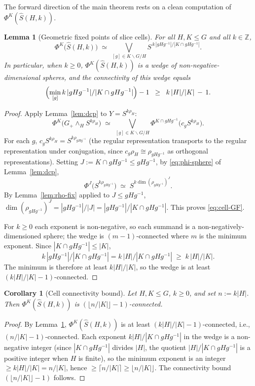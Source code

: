 \documentclass[12pt]{article}
\newtheorem{lemma}[theorem]{Lemma}
\newtheorem{corollary}[theorem]{Corollary}
\theoremstyle{definition}
\newcommand{\PhiK}{\Phi^{K}}
\newcommand{\ZZ}{\mathbb{Z}}
\begin{document}
The forward direction of the main theorem rests on a clean computation of
$\PhiK(\widehat{S}(H,k))$.

\begin{lemma}[Geometric fixed points of slice cells]\label{lem:GF-cells}
For all $H,K\leq G$ and all $k\in\ZZ$,
\begin{equation}
\PhiK\bigl(\widehat{S}(H,k)\bigr)
\;\simeq\;\bigvee_{[g]\in K\backslash G/H}S^{\,k\,|gHg^{-1}|/|K\cap gHg^{-1}|}.
\label{eq:cell-GF}
\end{equation}
In particular, when $k\geq 0$, $\PhiK(\widehat{S}(H,k))$ is a wedge of
non-negative-dimensional spheres, and the connectivity of this wedge equals
\[
\Bigl(\min_{[g]}k\,|gHg^{-1}|/|K\cap gHg^{-1}|\Bigr)-1
\;\;\geq\;\;
k\,|H|/|K|\,-\,1.
\]
\end{lemma}

\begin{proof}
Apply Lemma~\ref{lem:dcp} to $Y=S^{k\rho_{H}}$:
\[
\PhiK\bigl(G_{+}\wedge_{H}S^{k\rho_{H}}\bigr)
\;\simeq\;\bigvee_{[g]\in K\backslash G/H}
\Phi^{K\cap gHg^{-1}}\bigl(c_{g}S^{k\rho_{H}}\bigr).
\]
For each $g$, $c_{g}S^{k\rho_{H}}=S^{k\rho_{gHg^{-1}}}$ (the regular
representation transports to the regular representation under conjugation,
since $c_{g}\rho_{H}\cong\rho_{gHg^{-1}}$ as orthogonal representations).
Setting $J:=K\cap gHg^{-1}\leq gHg^{-1}$, by \eqref{eq:phi-sphere} of
Lemma~\ref{lem:dcp},
\[
\Phi^{J}\bigl(S^{k\rho_{gHg^{-1}}}\bigr)\;\simeq\;
S^{k\dim(\rho_{gHg^{-1}})^{J}}.
\]
By Lemma~\ref{lem:rho-fix} applied to $J\leq gHg^{-1}$,
$\dim(\rho_{gHg^{-1}})^{J}=|gHg^{-1}|/|J|=|gHg^{-1}|/|K\cap gHg^{-1}|$. This
proves \eqref{eq:cell-GF}.

For $k\geq 0$ each exponent is non-negative, so each summand is a
non-negatively-dimensioned sphere; the wedge is $(m-1)$-connected where $m$ is
the minimum exponent. Since $|K\cap gHg^{-1}|\leq|K|$,
\[
k\,|gHg^{-1}|/|K\cap gHg^{-1}|=k\,|H|/|K\cap gHg^{-1}|
\;\geq\;k\,|H|/|K|.
\]
The minimum is therefore at least $k|H|/|K|$, so the wedge is at least
$(k|H|/|K|-1)$-connected.
\end{proof}

\begin{corollary}[Cell connectivity bound]\label{cor:cell-conn}
Let $H,K\leq G$, $k\geq 0$, and set $n:=k|H|$. Then
$\PhiK(\widehat{S}(H,k))$ is $(\lfloor n/|K|\rfloor-1)$-connected.
\end{corollary}

\begin{proof}
By Lemma~\ref{lem:GF-cells}, $\PhiK(\widehat{S}(H,k))$ is at least
$(k|H|/|K|-1)$-connected, i.e., $(n/|K|-1)$-connected. Each exponent
$k|H|/|K\cap gHg^{-1}|$ in the wedge is a non-negative integer (since
$|K\cap gHg^{-1}|$ divides $|H|$, the quotient $|H|/|K\cap gHg^{-1}|$ is a
positive integer when $H$ is finite), so the minimum exponent is an integer
$\geq k|H|/|K|=n/|K|$, hence $\geq\lceil n/|K|\rceil\geq\lfloor n/|K|\rfloor$.
The connectivity bound $(\lfloor n/|K|\rfloor-1)$ follows.
\end{proof}
\end{document}
